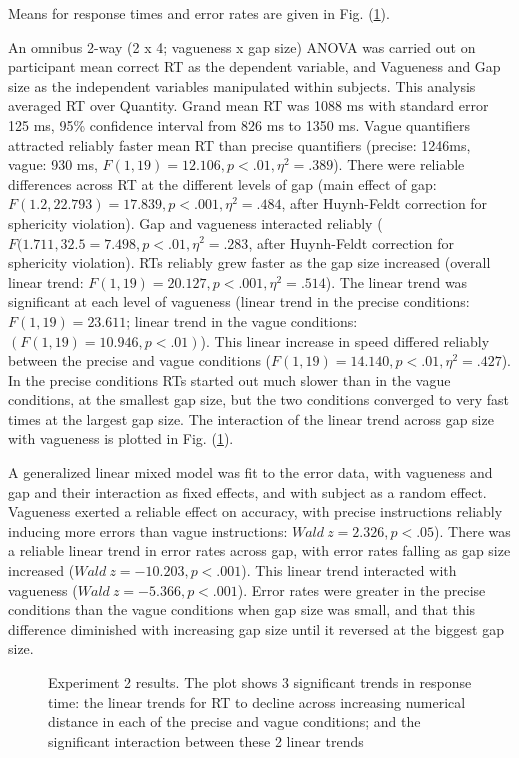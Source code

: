 \documentclass[man,floatmark]{apa}
\begin{document}
Means for response times and error rates are given in Fig. (\ref{resultse2}).

An omnibus 2-way (2 x 4; vagueness x gap size) ANOVA was carried out on participant mean correct RT as the dependent variable, and Vagueness and Gap size as the independent variables manipulated within subjects. This analysis averaged RT over Quantity. Grand mean RT was 1088 ms with standard error 125 ms, 95\% confidence interval from 826 ms to 1350 ms. Vague quantifiers attracted reliably faster mean RT than precise quantifiers (precise: 1246ms, vague: 930 ms, $F(1,19)=12.106, p<.01, \eta^2=.389$). There were reliable differences across RT at the different levels of gap (main effect of gap: $F(1.2, 22.793)=17.839, p<.001, \eta^2= .484$, after Huynh-Feldt correction for sphericity violation). Gap and vagueness interacted reliably ($F(1.711, 32.5 = 7.498, p<.01, \eta^2=.283$, after Huynh-Feldt correction for sphericity violation). RTs reliably grew faster as the gap size increased (overall linear trend: $F(1,19)=20.127, p<.001,\eta^2=.514$). The linear trend was significant at each level of vagueness (linear trend in the precise conditions: $F(1,19)=23.611$; linear trend in the vague conditions: $(F(1,19)=10.946, p<.01)$). This linear increase in speed differed reliably between the precise and vague conditions ($F(1,19)=14.140,p<.01,\eta^2=.427$). In the precise conditions RTs started out much slower than in the vague conditions, at the smallest gap size, but the two conditions converged to very fast times at the largest gap size. The interaction of the linear trend across gap size with vagueness is plotted in Fig. (\ref{resultse2}).

\label{accann}
A generalized linear mixed model \cite{jaeger2008categorical} was fit to the error data, with vagueness and gap and their interaction as fixed effects, and with subject as a random effect. Vagueness exerted a reliable effect on accuracy, with precise instructions reliably inducing more errors  than vague instructions: $Wald~z = 2.326, p<.05$). There was a reliable linear trend in error rates across gap, with error rates falling as gap size increased ($Wald~z = -10.203, p<.001$). This linear trend interacted with vagueness ($Wald~z=-5.366,p<.001$). Error rates were greater in the precise conditions than the vague conditions when gap size was small, and that this difference diminished with increasing gap size until it reversed at the biggest gap size.

\begin{figure}[htbp]
\caption{Experiment 2 results. The plot shows 3 significant trends in response time:  the linear trends for RT to decline across increasing numerical distance in each of the precise and vague conditions; and the significant interaction between these 2 linear trends}
\label{resultse2}
\end{figure}
\end{document}
